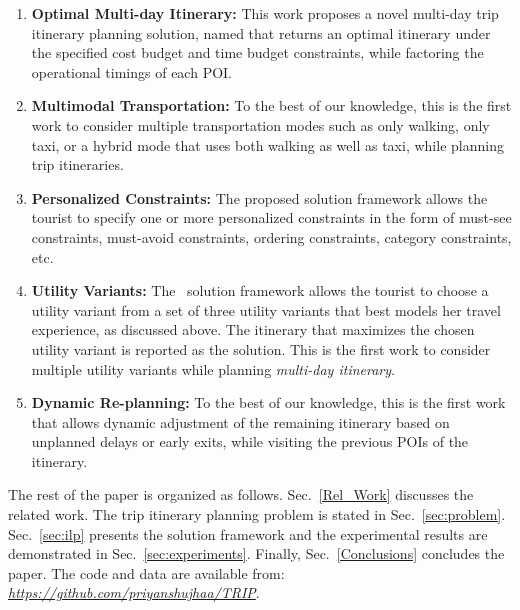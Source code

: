 \begin{enumerate}
\item \textbf{Optimal Multi-day Itinerary:} This work proposes a novel multi-day trip itinerary planning solution, named \trip that returns an optimal itinerary under the specified cost budget and time budget constraints, while factoring the operational timings of each POI.  
\item \textbf{Multimodal Transportation:} To the best of our knowledge, this is the first work to consider multiple transportation modes such as only walking, only taxi, or a hybrid mode that uses both walking as well as taxi, while planning trip itineraries.
\item \textbf{Personalized Constraints:} The proposed solution framework allows the tourist to specify one or more personalized constraints in the form of must-see constraints, must-avoid constraints, ordering constraints, category constraints, etc.
\item \textbf{Utility Variants:} The \trip~solution framework allows the tourist to choose a utility variant from a set of three utility variants that best models her travel experience, as discussed above. The itinerary that maximizes the chosen utility variant is reported as the solution. This is the first work to consider multiple utility variants while planning \emph{multi-day itinerary}.
\item \textbf{Dynamic Re-planning:} To the best of our knowledge, this is the first work that allows dynamic adjustment of the remaining itinerary based on unplanned delays or early exits, while visiting the previous POIs of the itinerary.
%
\end{enumerate}

 The rest of the paper is organized as follows. Sec.~\ref{Rel_Work}  discusses the related work. The trip itinerary planning problem is stated in Sec.~\ref{sec:problem}. Sec.~\ref{sec:ilp} presents the \trip solution framework and the experimental results are demonstrated in Sec.~\ref{sec:experiments}. Finally, Sec.~\ref{Conclusions} concludes the paper.
 The code and data are available from: \emph{\url{https://github.com/priyanshujhaa/TRIP}}.

